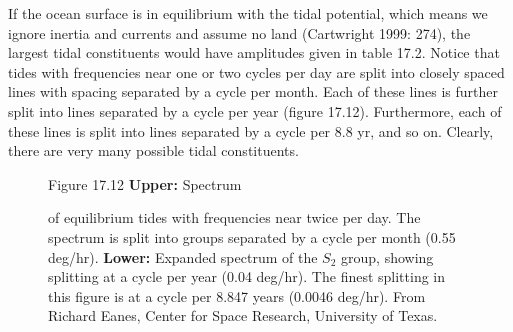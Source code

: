 If the ocean surface is in equilibrium with the tidal
potential, which means we ignore inertia and currents and assume no land (Cartwright 1999: 274), the
largest tidal constituents would have amplitudes given in table 17.2. Notice that tides with
frequencies near one or two cycles per day are split into closely spaced lines with spacing separated
by a cycle per month. Each of these lines is further split into lines separated by a cycle per year
(figure 17.12). Furthermore, each of these lines is split into lines separated by a cycle per
8.8 yr, and so on. Clearly, there are very many possible tidal constituents.

\begin{figure}[t!]
\footnotesize
Figure 17.12 \textbf{Upper:} Spectrum \rule{0mm}{3ex}of equilibrium
tides with frequencies near twice per day. The spectrum is split into
groups separated by a cycle per month (0.55 deg/hr). \textbf{Lower:} Expanded spectrum of the
$S_2$ group, showing splitting at a cycle per year (0.04 deg/hr). The finest splitting
in this figure is at a cycle per 8.847 years (0.0046 deg/hr). From Richard Eanes, Center for
Space Research, University of Texas.
\label{combinedtides}
\vspace{-3ex}
\end{figure}

